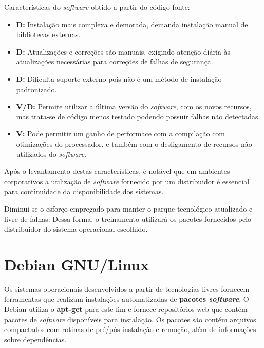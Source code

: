     Características do {\it software} obtido a partir do código fonte:

\begin{itemize}
\item{\bf } {\bf D:} Instalação mais complexa e demorada, demanda instalação
manual de bibliotecas externas.

\item{\bf } {\bf D:} Atualizações e correções são manuais, exigindo atenção
diária às atualizações necessárias para correções de falhas de segurança.

\item{\bf } {\bf D:} Dificulta suporte externo pois não é um método de
instalação padronizado.

\item{\bf } {\bf V/D:} Permite utilizar a última versão do {\it software},
com os novos recursos, mas trata-se de código menos testado podendo possuir
falhas não detectadas.

\item{\bf } {\bf V:} Pode permitir um ganho de performace com a compilação com
otimizações do processador, e também com o desligamento de recursos não
utilizados do {\it software}.

\end{itemize}

    Após o levantamento destas características, é notável que em ambientes
corporativos a utilização de {\it software} fornecido por um distribuidor é
essencial para continuidade da disponibilidade dos sistemas.

    Diminui-se o esforço empregado para manter o parque tecnológico atualizado
e livre de falhas. Dessa forma, o treinamento utilizará os pacotes fornecidos
pelo distribuidor do sistema operacional escolhido.

\section{Debian GNU/Linux}\setcounter{SteP}{1}

    Os sistemas operacionais desenvolvidos a partir de tecnologias livres
fornecem ferramentas que realizam instalações automatizadas de {\bf pacotes
{\it software}}. O Debian utiliza o {\bf apt-get} para este fim e fornece
repositórios web que contém pacotes de {\it software} disponíveis para
instalação. Os pacotes são contém arquivos compactados com rotinas de
pré/pós instalação e remoção, além de informações sobre dependências.

